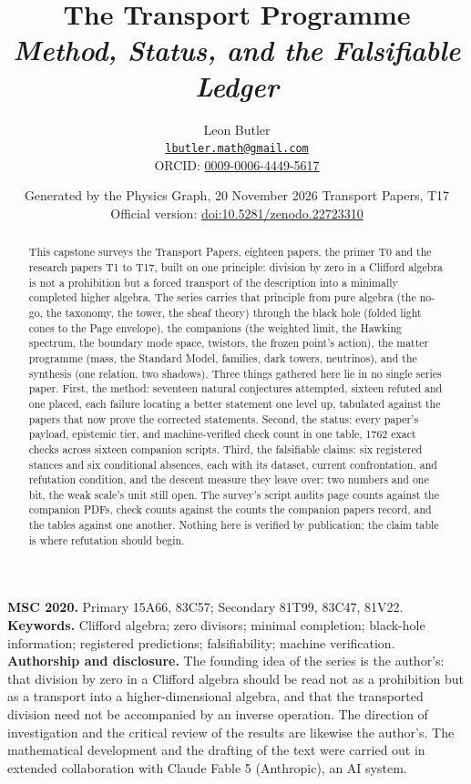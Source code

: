 \documentclass[11pt]{article}
\title{\bfseries The Transport Programme\\[4pt]\large\itshape Method, Status, and the Falsifiable Ledger}
\author{Leon Butler\\ \normalsize\href{mailto:lbutler.math@gmail.com}{\texttt{lbutler.math@gmail.com}}\\ \normalsize ORCID: \href{https://orcid.org/0009-0006-4449-5617}{0009-0006-4449-5617}}
\date{Generated by the Physics Graph, 20 November 2026 \textperiodcentered{} Transport Papers, T17\\[3pt]\small Official version: \href{https://doi.org/10.5281/zenodo.22723310}{doi:10.5281/zenodo.22723310}}
\theoremstyle{definition}
\theoremstyle{plain}
\begin{document}
\maketitle
\begin{abstract}
\normalsize
This capstone surveys the Transport Papers, eighteen papers, the primer T0 and the research papers T1 to T17, built on one principle: division by zero in a Clifford algebra is not a prohibition but a forced transport of the description into a minimally completed higher algebra. The series carries that principle from pure algebra (the no-go, the taxonomy, the tower, the sheaf theory) through the black hole (folded light cones to the Page envelope), the companions (the weighted limit, the Hawking spectrum, the boundary mode space, twistors, the frozen point's action), the matter programme (mass, the Standard Model, families, dark towers, neutrinos), and the synthesis (one relation, two shadows). Three things gathered here lie in no single series paper. First, the method: seventeen natural conjectures attempted, sixteen refuted and one placed, each failure locating a better statement one level up, tabulated against the papers that now prove the corrected statements. Second, the status: every paper's payload, epistemic tier, and machine-verified check count in one table, 1762 exact checks across sixteen companion scripts. Third, the falsifiable claims: six registered stances and six conditional absences, each with its dataset, current confrontation, and refutation condition, and the descent measure they leave over: two numbers and one bit, the weak scale's unit still open. The survey's script audits page counts against the companion PDFs, check counts against the counts the companion papers record, and the tables against one another. Nothing here is verified by publication; the claim table is where refutation should begin.
\end{abstract}
\medskip
\noindent\textbf{MSC 2020.} Primary 15A66, 83C57; Secondary 81T99, 83C47, 81V22.\\
\textbf{Keywords.} Clifford algebra; zero divisors; minimal completion; black-hole information; registered predictions; falsifiability; machine verification.
\newpage
\noindent \textbf{Authorship and disclosure. }The founding idea of the series is the author's: that division by zero in a Clifford algebra should be read not as a prohibition but as a transport into a higher-dimensional algebra, and that the transported division need not be accompanied by an inverse operation. The direction of investigation and the critical review of the results are likewise the author's. The mathematical development and the drafting of the text were carried out in extended collaboration with Claude Fable 5 (Anthropic), an AI system.
\end{document}
